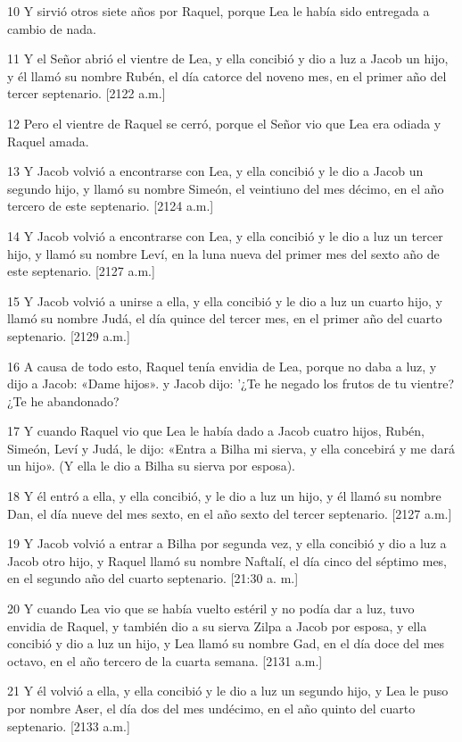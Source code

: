 \par 10 Y sirvió otros siete años por Raquel, porque Lea le había sido entregada a cambio de nada.
\par 11 Y el Señor abrió el vientre de Lea, y ella concibió y dio a luz a Jacob un hijo, y él llamó su nombre Rubén, el día catorce del noveno mes, en el primer año del tercer septenario. [2122 a.m.]
\par 12 Pero el vientre de Raquel se cerró, porque el Señor vio que Lea era odiada y Raquel amada.
\par 13 Y Jacob volvió a encontrarse con Lea, y ella concibió y le dio a Jacob un segundo hijo, y llamó su nombre Simeón, el veintiuno del mes décimo, en el año tercero de este septenario. [2124 a.m.]
\par 14 Y Jacob volvió a encontrarse con Lea, y ella concibió y le dio a luz un tercer hijo, y llamó su nombre Leví, en la luna nueva del primer mes del sexto año de este septenario. [2127 a.m.]
\par 15 Y Jacob volvió a unirse a ella, y ella concibió y le dio a luz un cuarto hijo, y llamó su nombre Judá, el día quince del tercer mes, en el primer año del cuarto septenario. [2129 a.m.]
\par 16 A causa de todo esto, Raquel tenía envidia de Lea, porque no daba a luz, y dijo a Jacob: «Dame hijos». y Jacob dijo: '¿Te he negado los frutos de tu vientre? ¿Te he abandonado?
\par 17 Y cuando Raquel vio que Lea le había dado a Jacob cuatro hijos, Rubén, Simeón, Leví y Judá, le dijo: «Entra a Bilha mi sierva, y ella concebirá y me dará un hijo». (Y ella le dio a Bilha su sierva por esposa).
\par 18 Y él entró a ella, y ella concibió, y le dio a luz un hijo, y él llamó su nombre Dan, el día nueve del mes sexto, en el año sexto del tercer septenario. [2127 a.m.]
\par 19 Y Jacob volvió a entrar a Bilha por segunda vez, y ella concibió y dio a luz a Jacob otro hijo, y Raquel llamó su nombre Naftalí, el día cinco del séptimo mes, en el segundo año del cuarto septenario. [21:30 a. m.]
\par 20 Y cuando Lea vio que se había vuelto estéril y no podía dar a luz, tuvo envidia de Raquel, y también dio a su sierva Zilpa a Jacob por esposa, y ella concibió y dio a luz un hijo, y Lea llamó su nombre Gad, en el día doce del mes octavo, en el año tercero de la cuarta semana. [2131 a.m.]
\par 21 Y él volvió a ella, y ella concibió y le dio a luz un segundo hijo, y Lea le puso por nombre Aser, el día dos del mes undécimo, en el año quinto del cuarto septenario. [2133 a.m.]
